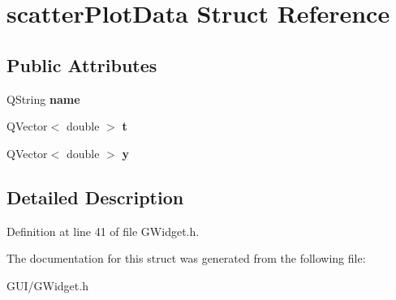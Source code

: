 \hypertarget{structscatter_plot_data}{}\section{scatter\+Plot\+Data Struct Reference}
\label{structscatter_plot_data}
\subsection*{Public Attributes}
\begin{DoxyCompactItemize}
\item 
\mbox{\label{structscatter_plot_data_a6bd71120c6a27803e40778f49bd060eb}} 
Q\+String {\bfseries name}
\item 
\mbox{\label{structscatter_plot_data_a7043fe34be801adf47ce9c70041e9c5d}} 
Q\+Vector$<$ double $>$ {\bfseries t}
\item 
\mbox{\label{structscatter_plot_data_a2dbd1a6a731cfac34c1c696ca0626b3c}} 
Q\+Vector$<$ double $>$ {\bfseries y}
\end{DoxyCompactItemize}


\subsection{Detailed Description}


Definition at line 41 of file G\+Widget.\+h.



The documentation for this struct was generated from the following file\+:\begin{DoxyCompactItemize}
\item 
G\+U\+I/G\+Widget.\+h\end{DoxyCompactItemize}
